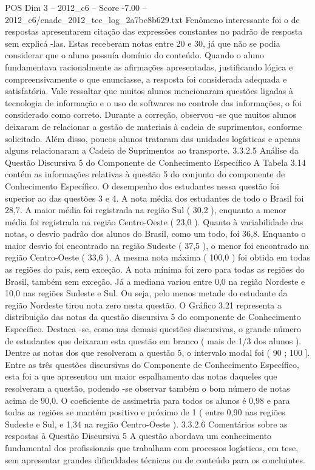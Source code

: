 \begin{textsample}{POS Dim 3 – 2012\_c6 – Score -7.00 – 2012\_c6/enade\_2012\_tec\_log\_2a7bc8b629.txt}
Fenômeno interessante foi o de respostas apresentarem citação das expressões constantes no padrão de resposta sem explicá -las.
Estas receberam notas entre 20 e 30, já que não se podia considerar que o aluno possuía domínio do conteúdo.
Quando o aluno fundamentava racionalmente as afirmações apresentadas, justificando lógica e compreensivamente o que enunciasse, a resposta foi considerada adequada e satisfatória.
Vale ressaltar que muitos alunos mencionaram questões ligadas à tecnologia de informação e o uso de softwares no controle das informações, o foi considerado como correto.
Durante a correção, observou -se que muitos alunos deixaram de relacionar a gestão de materiais à cadeia de suprimentos, conforme solicitado.
Além disso, poucos alunos trataram das unidades logísticas e apenas alguns relacionaram a Cadeia de Suprimentos ao transporte. 3.3.2.5 Análise da Questão Discursiva 5 do Componente de Conhecimento Específico A Tabela 3.14 contém as informações relativas à questão 5 do conjunto do componente de Conhecimento Específico.
O desempenho dos estudantes nessa questão foi superior ao das questões 3 e 4.
A nota média dos estudantes de todo o Brasil foi 28,7.
A maior média foi registrada na região Sul ( 30,2 ), enquanto a menor média foi registrada na região Centro-Oeste ( 23,0 ).
Quanto à variabilidade das notas, o desvio padrão dos alunos do Brasil, como um todo, foi 36,8.
Enquanto o maior desvio foi encontrado na região Sudeste ( 37,5 ), o menor foi encontrado na região Centro-Oeste ( 33,6 ).
A mesma nota máxima ( 100,0 ) foi obtida em todas as regiões do país, sem exceção.
A nota mínima foi zero para todas as regiões do Brasil, também sem exceção.
Já a mediana variou entre 0,0 na região Nordeste e 10,0 nas regiões Sudeste e Sul.
Ou seja, pelo menos metade do estudante da região Nordeste tirou nota zero nesta questão.
O Gráfico 3.21 representa a distribuição das notas da questão discursiva 5 do componente de Conhecimento Específico.
Destaca -se, como nas demais questões discursivas, o grande número de estudantes que deixaram esta questão em branco ( mais de 1/3 dos alunos ).
Dentre as notas dos que resolveram a questão 5, o intervalo modal foi ( 90 ; 100 ].
Entre as três questões discursivas do Componente de Conhecimento Específico, esta foi a que apresentou um maior espalhamento das notas daqueles que resolveram a questão, podendo -se observar também o bom número de notas acima de 90,0.
O coeficiente de assimetria para todos os alunos é 0,98 e para todas as regiões se mantém positivo e próximo de 1 ( entre 0,90 nas regiões Sudeste e Sul, e 1,34 na região Centro-Oeste ). 3.3.2.6 Comentários sobre as respostas à Questão Discursiva 5 A questão abordava um conhecimento fundamental dos profissionais que trabalham com processos logísticos, em tese, sem apresentar grandes dificuldades técnicas ou de conteúdo para os concluintes.

\end{textsample}
